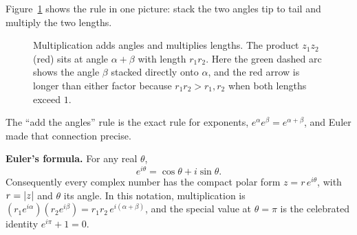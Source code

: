 Figure~\ref{ch39:fig-mult} shows the rule in one picture: stack the two angles tip to tail and
multiply the two lengths.

\begin{figure}[H]
\centering
{}
\caption{Multiplication adds angles and multiplies lengths. The product $z_1 z_2$ (red) sits at angle
$\alpha+\beta$ with length $r_1 r_2$. Here the green dashed arc shows the angle $\beta$ stacked
directly onto $\alpha$, and the red arrow is longer than either factor because $r_1 r_2 > r_1, r_2$
when both lengths exceed $1$.}
\label{ch39:fig-mult}
\end{figure}

The ``add the angles'' rule is the exact rule for exponents, $e^\alpha e^\beta = e^{\alpha+\beta}$,
and Euler made that connection precise.

\begin{formalbox}
\textbf{Euler's formula.} For any real $\theta$,
\[
e^{i\theta} = \cos\theta + i\sin\theta.
\]
Consequently every complex number has the compact polar form $z = r\,e^{i\theta}$, with $r =
\lvert z\rvert$ and $\theta$ its angle. In this notation, multiplication is
$ (r_1 e^{i\alpha})(r_2 e^{i\beta}) = r_1 r_2\, e^{i(\alpha+\beta)}$, and the special value at
$\theta = \pi$ is the celebrated identity $e^{i\pi} + 1 = 0$.
\end{formalbox}

